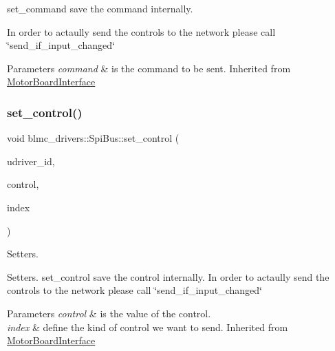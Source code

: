 set\+\_\+command save the command internally. 

In order to actaully send the controls to the network please call \char`\"{}send\+\_\+if\+\_\+input\+\_\+changed\char`\"{}


\begin{DoxyParams}{Parameters}
{\em command} & is the command to be sent. Inherited from \hyperlink{classblmc__drivers_1_1MotorBoardInterface}{Motor\+Board\+Interface} \\
\hline
\end{DoxyParams}
\mbox{\label{classblmc__drivers_1_1SpiBus_a9cf14c27b226c454795cc1e508ae9a2f}} 
\subsubsection{\texorpdfstring{set\+\_\+control()}{set\_control()}}
{\footnotesize\ttfamily void blmc\+\_\+drivers\+::\+Spi\+Bus\+::set\+\_\+control (\begin{DoxyParamCaption}\item[{const size\+\_\+t}]{udriver\+\_\+id,  }\item[{const double \&}]{control,  }\item[{const \hyperlink{classblmc__drivers_1_1MotorBoardInterface_a82ed4d0fa527521707281396095a88ca}{Motor\+Board\+Interface\+::\+Control\+Index} \&}]{index }\end{DoxyParamCaption})\hspace{0.3cm}{\ttfamily [virtual]}}



Setters. 

Setters. set\+\_\+control save the control internally. In order to actaully send the controls to the network please call \char`\"{}send\+\_\+if\+\_\+input\+\_\+changed\char`\"{}


\begin{DoxyParams}{Parameters}
{\em control} & is the value of the control. \\
\hline
{\em index} & define the kind of control we want to send. Inherited from \hyperlink{classblmc__drivers_1_1MotorBoardInterface}{Motor\+Board\+Interface} \\
\hline
\end{DoxyParams}


